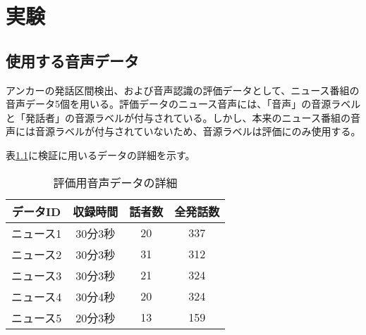 \chapter{実験}
\section{使用する音声データ}
\label{section:test_audio}
アンカーの発話区間検出、および音声認識の評価データとして、ニュース番組の音声データ5個を用いる。評価データのニュース音声には、「音声」の音源ラベルと「発話者」の音源ラベルが付与されている。しかし、本来のニュース番組の音声には音源ラベルが付与されていないため、音源ラベルは評価にのみ使用する。\par
表\ref{table:test_detail}に検証に用いるデータの詳細を示す。

\begin{table}[H]
  \begin{center}
    \caption{評価用音声データの詳細 \label{table:test_detail}}
    \begin{tabular}{|c||c|c|c|} \hline
      データID & 収録時間 & 話者数 & 全発話数 \\ \hline
      ニュース1 & 30分3秒 & 20 & 337 \\ \hline
      ニュース2 & 30分3秒 & 31 & 312\\ \hline
      ニュース3 & 30分3秒 & 21 & 324 \\ \hline
      ニュース4 & 30分4秒 & 20 & 324\\ \hline
      ニュース5 & 20分3秒 & 13 & 159\\ \hline
    \end{tabular}
  \end{center}
\end{table}




